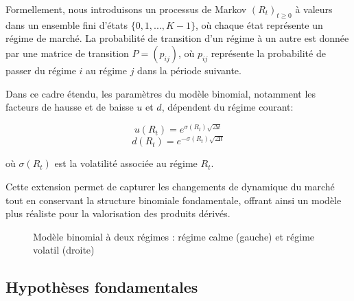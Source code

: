 \documentclass[12pt,a4paper]{report}
\begin{document}
Formellement, nous introduisons un processus de Markov $(R_t)_{t \geq 0}$ à valeurs dans un ensemble fini d'états $\{0, 1, ..., K-1\}$, où chaque état représente un régime de marché. La probabilité de transition d'un régime à un autre est donnée par une matrice de transition $P = (p_{ij})$, où $p_{ij}$ représente la probabilité de passer du régime $i$ au régime $j$ dans la période suivante.


Dans ce cadre étendu, les paramètres du modèle binomial, notamment les facteurs de hausse et de baisse $u$ et $d$, dépendent du régime courant:

$$u(R_t) = e^{\sigma(R_t) \sqrt{\Delta t}}$$
$$d(R_t) = e^{-\sigma(R_t) \sqrt{\Delta t}}$$

où $\sigma(R_t)$ est la volatilité associée au régime $R_t$.

Cette extension permet de capturer les changements de dynamique du marché tout en conservant la structure binomiale fondamentale, offrant ainsi un modèle plus réaliste pour la valorisation des produits dérivés.

\begin{figure}[H]
\centering
{}
\caption{Modèle binomial à deux régimes : régime calme (gauche) et régime volatil (droite)}
\label{fig:two_regime_model}
\end{figure}

\subsection{Hypothèses fondamentales}
\end{document}
